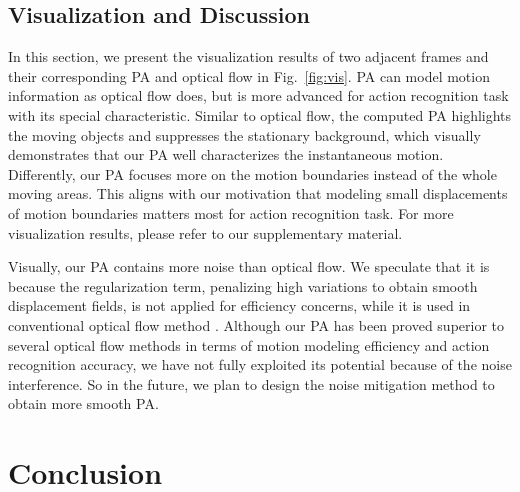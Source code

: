 \documentclass[journal]{IEEEtran}
\begin{document}
\subsection{Visualization and Discussion} \label{section:visualization}

In this section, we present the visualization results of two adjacent frames and their corresponding PA and optical flow in Fig.~\ref{fig:vis}. PA can model motion information as optical flow does, but is more advanced for action recognition task with its special characteristic. Similar to optical flow, the computed PA highlights the moving objects and suppresses the stationary background, which visually demonstrates that our PA well characterizes the instantaneous motion. Differently, our PA focuses more on the motion boundaries instead of the whole moving areas. This aligns with our motivation that modeling small displacements of motion boundaries matters most for action recognition task. For more visualization results, please refer to our supplementary material.



Visually, our PA contains more noise than optical flow. We speculate that it is because the regularization term, penalizing high variations to obtain smooth displacement fields, is not applied for efficiency concerns, while it is used in conventional optical flow method \cite{zach2007duality}. Although our PA has been proved superior to several optical flow methods in terms of motion modeling efficiency and action recognition accuracy, we have not fully exploited its potential because of the noise interference. So in the future, we plan to design the noise mitigation method to obtain more smooth PA.







\section{Conclusion}
\end{document}
